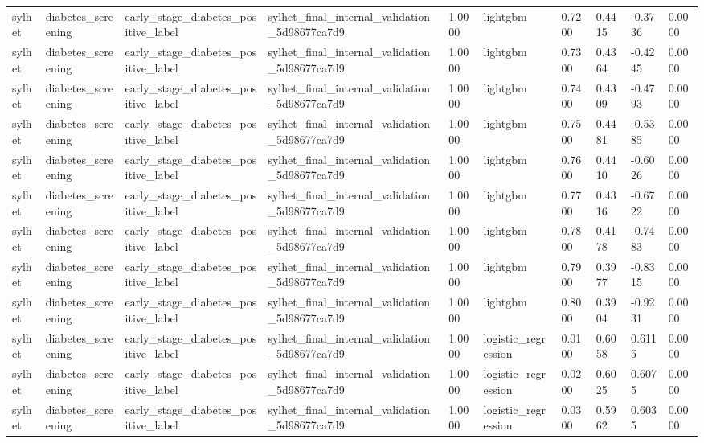 \begin{tabular}{llllllllll}
sylhet & diabetes\_screening & early\_stage\_diabetes\_positive\_label & sylhet\_final\_internal\_validation\_5d98677ca7d9 & 1.0000 & lightgbm & 0.7200 & 0.4415 & -0.3736 & 0.0000 \\
sylhet & diabetes\_screening & early\_stage\_diabetes\_positive\_label & sylhet\_final\_internal\_validation\_5d98677ca7d9 & 1.0000 & lightgbm & 0.7300 & 0.4364 & -0.4245 & 0.0000 \\
sylhet & diabetes\_screening & early\_stage\_diabetes\_positive\_label & sylhet\_final\_internal\_validation\_5d98677ca7d9 & 1.0000 & lightgbm & 0.7400 & 0.4309 & -0.4793 & 0.0000 \\
sylhet & diabetes\_screening & early\_stage\_diabetes\_positive\_label & sylhet\_final\_internal\_validation\_5d98677ca7d9 & 1.0000 & lightgbm & 0.7500 & 0.4481 & -0.5385 & 0.0000 \\
sylhet & diabetes\_screening & early\_stage\_diabetes\_positive\_label & sylhet\_final\_internal\_validation\_5d98677ca7d9 & 1.0000 & lightgbm & 0.7600 & 0.4410 & -0.6026 & 0.0000 \\
sylhet & diabetes\_screening & early\_stage\_diabetes\_positive\_label & sylhet\_final\_internal\_validation\_5d98677ca7d9 & 1.0000 & lightgbm & 0.7700 & 0.4316 & -0.6722 & 0.0000 \\
sylhet & diabetes\_screening & early\_stage\_diabetes\_positive\_label & sylhet\_final\_internal\_validation\_5d98677ca7d9 & 1.0000 & lightgbm & 0.7800 & 0.4178 & -0.7483 & 0.0000 \\
sylhet & diabetes\_screening & early\_stage\_diabetes\_positive\_label & sylhet\_final\_internal\_validation\_5d98677ca7d9 & 1.0000 & lightgbm & 0.7900 & 0.3977 & -0.8315 & 0.0000 \\
sylhet & diabetes\_screening & early\_stage\_diabetes\_positive\_label & sylhet\_final\_internal\_validation\_5d98677ca7d9 & 1.0000 & lightgbm & 0.8000 & 0.3904 & -0.9231 & 0.0000 \\
sylhet & diabetes\_screening & early\_stage\_diabetes\_positive\_label & sylhet\_final\_internal\_validation\_5d98677ca7d9 & 1.0000 & logistic\_regression & 0.0100 & 0.6058 & 0.6115 & 0.0000 \\
sylhet & diabetes\_screening & early\_stage\_diabetes\_positive\_label & sylhet\_final\_internal\_validation\_5d98677ca7d9 & 1.0000 & logistic\_regression & 0.0200 & 0.6025 & 0.6075 & 0.0000 \\
sylhet & diabetes\_screening & early\_stage\_diabetes\_positive\_label & sylhet\_final\_internal\_validation\_5d98677ca7d9 & 1.0000 & logistic\_regression & 0.0300 & 0.5962 & 0.6035 & 0.0000 \\

\end{tabular}
